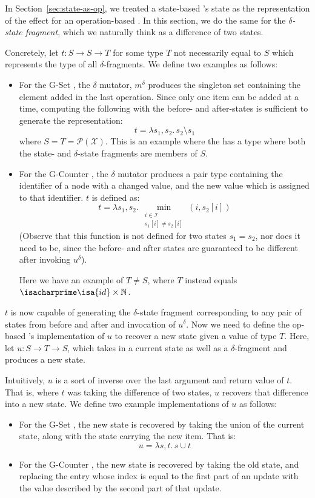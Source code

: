 In Section~\ref{sec:state-as-op}, we treated a state-based \CRDT's state as
the representation of the effect for an operation-based \CRDT. In this section,
we do the same for the \emph{$\delta$-state fragment}, which we naturally think
as a difference of two states.

Concretely, let $t : S \to S \to T$ for some type $T$ not necessarily equal to
$S$ which represents the type of all $\delta$-fragments. We define two examples
as follows:
\begin{itemize}
  \item For the G-Set \CRDT, the $\delta$ mutator, $m^\delta$ produces the
    singleton set containing the element added in the last operation. Since only
    one item can be added at a time, computing the following with the before-
    and after-states is sufficient to generate the representation:
    \[
      t = \lambda s_1, s_2.\, s_2 \setminus s_1
    \]
    where $S = T = \mathcal{P}(\mathcal{X})$. This is an example where the \CRDT
    has a type where both the state- and $\delta$-state fragments are members of
    $S$.
  \item For the G-Counter \CRDT, the $\delta$ mutator produces a pair
    type containing the identifier of a node with a changed value, and the new
    value which is assigned to that identifier. $t$ is defined as:
    \[
      t = \lambda s_1, s_2.\, \min_{\substack{i \in \mathcal{I} \\ s_1[i] \ne
        s_2[i]}} (i, s_2[i])
    \]
    (Observe that this function is not defined for two states $s_1 = s_2$, nor
    does it need to be, since the before- and after states are guaranteed to be
    different after invoking $u^\delta$).

    Here we have an example of $T \ne S$, where $T$ instead equals
    $\isacharprime\isa{id} \times \mathbb{N}$.
\end{itemize}

$t$ is now capable of generating the $\delta$-state fragment corresponding to
any pair of states from before and after and invocation of $u^\delta$. Now we
need to define the op-based \CRDT's implementation of $u$ to recover a new state
given a value of type $T$. Here, let $u : S \to T \to S$, which takes in a
current state as well as a $\delta$-fragment and produces a new state.

Intuitively, $u$ is a sort of inverse over the last argument and return value of
$t$. That is, where $t$ was taking the difference of two states, $u$ recovers
that difference into a new state. We define two example implementations of $u$
as follows:
\begin{itemize}
  \item For the G-Set \CRDT, the new state is recovered by taking the union of
    the current state, along with the state carrying the new item. That is:
    \[
      u = \lambda s, t.\, s \cup t
    \]
  \item For the G-Counter \CRDT, the new state is recovered by taking the old
    state, and replacing the entry whose index is equal to the first part of an
    update with the value described by the second part of that update.
\end{itemize}

